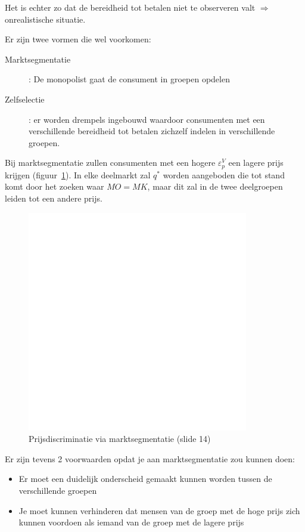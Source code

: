 Het is echter zo dat de bereidheid tot betalen niet te observeren valt $\Rightarrow$ onrealistische situatie.

Er zijn twee vormen die wel voorkomen:
\begin{description}
   \item[Marktsegmentatie]: De monopolist gaat de consument in groepen opdelen
   \item[Zelfselectie]: er worden drempels ingebouwd waardoor consumenten met een verschillende bereidheid tot betalen zichzelf indelen in verschillende groepen.
\end{description}

Bij marktsegmentatie zullen consumenten met een hogere $\varepsilon^V_p$ een lagere prijs krijgen (figuur~\ref{fig:marktsegmentatie}). In elke deelmarkt zal $q^*$ worden aangeboden die tot stand komt door het zoeken waar $MO = MK$, maar dit zal in de twee deelgroepen leiden tot een andere prijs.
\begin{figure}[htbp]
   \centering
   \includegraphics[scale=0.4]{Images/white.png}
   \caption{Prijsdiscriminatie via marktsegmentatie (slide 14)}
   \label{fig:marktsegmentatie}
\end{figure}

Er zijn tevens 2 voorwaarden opdat je aan marktsegmentatie zou kunnen doen:
\begin{itemize}
   \item Er moet een duidelijk onderscheid gemaakt kunnen worden tussen de verschillende groepen
   \item Je moet kunnen verhinderen dat mensen van de groep met de hoge prijs zich kunnen voordoen als iemand van de groep met de lagere prijs
\end{itemize}

